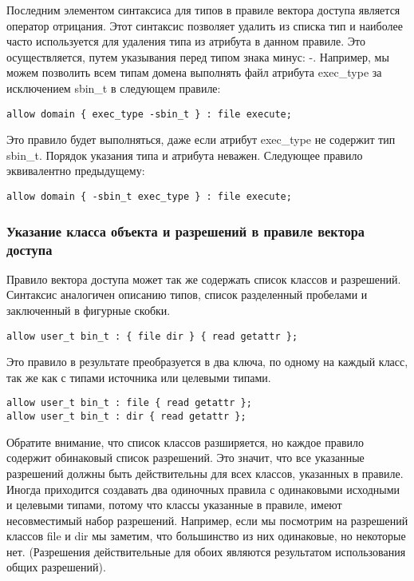 \documentclass{./../class/UIR}
\begin{document}
Последним элементом синтаксиса для типов в правиле вектора доступа является
оператор отрицания. Этот синтаксис позволяет удалить из списка тип и наиболее
часто используется для удаления типа из атрибута в данном правиле. Это
осуществляется, путем указывания перед типом знака минус: -. Например, мы можем
позволить всем типам домена выполнять файл атрибута exec\_type за исключением
sbin\_t в следующем правиле:

\begin{verbatim}
allow domain { exec_type -sbin_t } : file execute;
\end{verbatim}

Это правило будет выполняться, даже если атрибут exec\_type не содержит тип
sbin\_t.
Порядок указания типа и атрибута неважен. Следующее правило эквивалентно предыдущему:

\begin{verbatim}
allow domain { -sbin_t exec_type } : file execute;
\end{verbatim}

\subsubsection{Указание класса объекта и разрешений в правиле вектора доступа}

Правило вектора доступа может так же содержать список классов и разрешений.
Синтаксис аналогичен описанию типов, список разделенный пробелами и заключенный
в фигурные скобки.

\begin{verbatim}
allow user_t bin_t : { file dir } { read getattr };
\end{verbatim}

Это правило в результате преобразуется в два ключа, по одному на каждый класс,
так же как с типами источника или целевыми типами.

\begin{verbatim}
allow user_t bin_t : file { read getattr };
allow user_t bin_t : dir { read getattr };
\end{verbatim}

Обратите внимание, что список классов разширяется, но каждое правило содержит
обинаковый список разрешений. Это значит, что все указанные разрешений должны
быть действительны для всех классов, указанных в правиле. Иногда приходится
создавать два одиночных правила с одинаковыми исходными и целевыми типами,
потому что классы указанные в правиле, имеют несовместимый набор разрешений.
Например, если мы посмотрим на разрешений классов file и dir мы заметим, что
большинство из них одинаковые, но некоторые нет. (Разрешения действительные для
обоих являются результатом использования общих разрешений).
\end{document}
